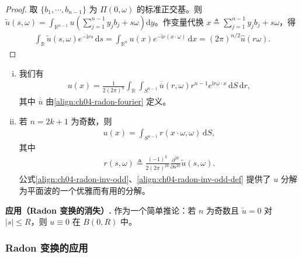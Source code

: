 \documentclass[../../main.tex]{subfiles}
\begin{document}
\begin{proof}
取 $\{b_1,\cdots,b_{n-1}\}$ 为 $\Pi(0,\omega)$ 的标准正交基。则 $\widetilde{u}(s,\omega)=\int_{\mathbb{R}^{n-1}}u\!\left(\sum_{j=1}^{n-1}y_j b_j+s\omega\right)\mathrm{d}y$。作变量代换 $x\triangleq\sum_{j=1}^{n-1}y_jb_j+s\omega$，得
\begin{align*}
\int_{\mathbb{R}}\widetilde{u}(s,\omega)e^{-\mathrm{i}rs}\,\mathrm{d}s=\int_{\mathbb{R}^n}u(x)e^{-\mathrm{i}r(x\cdot\omega)}\,\mathrm{d}x=(2\pi)^{n/2}\widehat{u}(r\omega).
\end{align*}
\end{proof}

\begin{theorem}\label{theorem:ch04-radon-inv}
\begin{enumerate}[(i)]
\item 我们有
\begin{align}\label{align:ch04-radon-inv-general}
u(x)=\frac{1}{2(2\pi)^n}\int_{\mathbb{R}}\int_{S^{n-1}}\overline{\overline{u}}(r,\omega)r^{n-1}e^{\mathrm{i}r\omega\cdot x}\,\mathrm{d}S\,\mathrm{d}r,
\end{align}
其中 $\overline{\overline{u}}$ 由\eqref{align:ch04-radon-fourier} 定义。
\item 若 $n=2k+1$ 为奇数，则
\begin{align}\label{align:ch04-radon-inv-odd}
u(x)=\int_{S^{n-1}}r(x\cdot\omega,\omega)\,\mathrm{d}S,
\end{align}
其中
\begin{align}\label{align:ch04-radon-inv-odd-def}
r(s,\omega)\triangleq\frac{(-1)^k}{2(2\pi)^{2k}}\frac{\partial^{2k}}{\partial s^{2k}}\widetilde{u}(s,\omega).
\end{align}
公式\eqref{align:ch04-radon-inv-odd}、\eqref{align:ch04-radon-inv-odd-def} 提供了 $u$ 分解为平面波的一个优雅而有用的分解。
\end{enumerate}
\end{theorem}

\textbf{应用（Radon 变换的消失）.} 作为一个简单推论：若 $n$ 为奇数且 $\widetilde{u}=0$ 对 $|s|\leqslant R$，则 $u\equiv 0$ 在 $B(0,R)$ 中。

\subsubsection{Radon 变换的应用}
\end{document}
